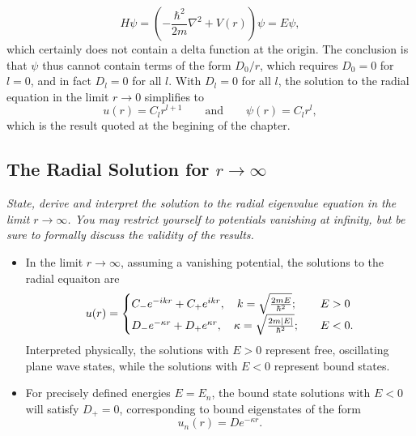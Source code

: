 \documentclass[11pt, a4paper]{article}
\renewcommand{\laplacian}{\nabla^{2}}
\newcommand{\eqtext}[1]{\qquad \text{#1} \qquad}
\newcommand{\p}{\psi}  %
\begin{document}
\begin{itemize}
    \begin{equation*}
        H \psi = \left( - \frac{\hbar^{2}}{2m}\laplacian + V(r) \right) \psi = E\psi,
    \end{equation*}
    which certainly does not contain a delta function at the origin. The conclusion is that $ \psi $ thus cannot contain terms of the form $ D_{0}/r $, which requires $ D_{0} = 0 $ for $ l = 0 $, and in fact $ D_{l} = 0 $ for all $ l $. With $ D_{l} = 0 $ for all $ l $, the solution to the radial equation in the limit $ r \to 0 $ simplifies to 
	\begin{equation*}
		u(r) = C_{l}r^{l+1} \eqtext{and} \p(r) = C_{l}r^{l},
	\end{equation*}
    which is the result quoted at the begining of the chapter.
	
\end{itemize}

\subsection{The Radial Solution for $ r \to \infty $}
\textit{State, derive and interpret the solution to the radial eigenvalue equation in the limit $ r \to \infty $. You may restrict yourself to potentials vanishing at infinity, but be sure to formally discuss the validity of the results.}


\begin{itemize}
    \item In the limit $ r \to \infty $, assuming a vanishing potential, the solutions to the radial equaiton are
    \begin{equation*}
        u(r) = 
        \begin{cases}
            C_{-}e^{-ikr} + C_{+}e^{ikr}, \quad k = \sqrt{\frac{2mE}{\hbar^{2}}}; & \quad E > 0\\
            D_{-}e^{-\kappa r} + D_{+}e^{\kappa r}, \quad \kappa = \sqrt{\frac{2m \abs{E}}{\hbar^{2}}}; & \quad E < 0.
        \end{cases}   
    \end{equation*}
    Interpreted physically, the solutions with $ E > 0 $ represent free, oscillating plane wave states, while the solutions with $ E < 0 $ represent bound states. 

    \item For precisely defined energies $ E = E_{n} $, the bound state solutions with $ E < 0 $ will satisfy $ D_{+} = 0 $, corresponding to bound eigenstates of the form
    \begin{equation*}
        u_{n}(r) = D e^{- \kappa r}.
    \end{equation*}
    
    
    
\end{itemize}
\end{document}
